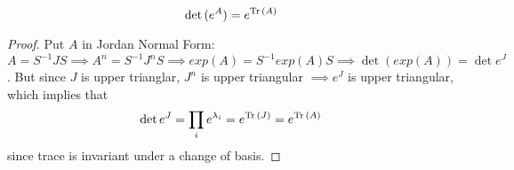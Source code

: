     \begin{proposition}
      \begin{equation}
        \det{(e^A)} = e^{\Tr{(A)}}
      \end{equation}
    \end{proposition}
    \begin{proof}
      Put $A$ in Jordan Normal Form: $A = S^{-1} J S \implies A^n = S^{-1} J^n S \implies exp(A) = S^{-1} exp(A) S \implies \det{(exp(A))} = \det{e^J}$. But since $J$ is upper trianglar, $J^n$ is upper triangular $\implies e^J$ is upper triangular, which implies that 
      \begin{equation}
        \det{e^J} = \prod_i e^{\lambda_i} = e^{\Tr{(J)}} = e^{\Tr{(A)}}
      \end{equation}
      since trace is invariant under a change of basis. 
    \end{proof}

